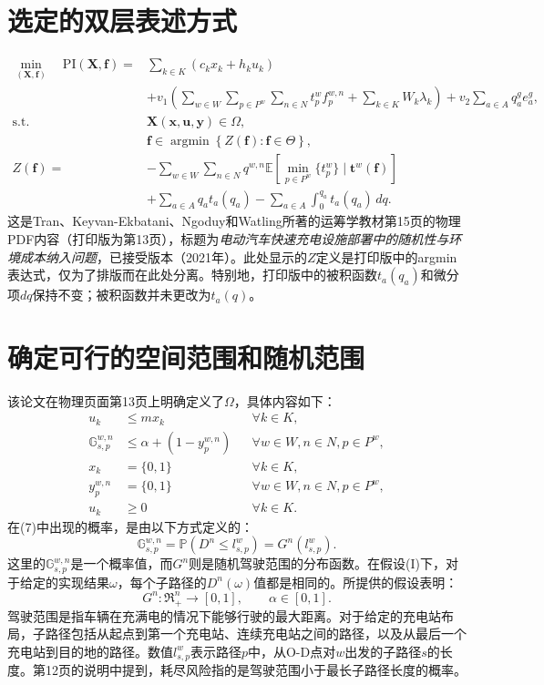 \documentclass{article}
\begin{document}
\section*{选定的双层表述方式}
\begin{equation}
\begin{aligned}
\min_{(\mathbf X,\mathbf f)}\quad
\mathrm{PI}(\mathbf X,\mathbf f)
={}&\sum_{k\in K}(c_kx_k+h_ku_k)\\
&+v_1\left(\sum_{w\in W}\sum_{p\in P^w}\sum_{n\in N}t_p^wf_p^{w,n}
+\sum_{k\in K}W_k\lambda_k\right)
+v_2\sum_{a\in A}q_a^ge_a^g,\\
\text{s.t.}\quad&\mathbf X(\mathbf x,\mathbf u,\mathbf y)\in\Omega,\\
&\mathbf f\in\operatorname*{argmin}\left\{Z(\mathbf f):\mathbf f\in\Theta\right\},\\
Z(\mathbf f)={}&-\sum_{w\in W}\sum_{n\in N}q^{w,n}
\mathbb E\left[\min_{p\in P^w}\{t_p^w\}\mid\mathbf t^w(\mathbf f)\right]\\
&+\sum_{a\in A}q_at_a(q_a)-\sum_{a\in A}\int_0^{q_a}t_a(q_a)\,dq.
\end{aligned}\tag{23}
\end{equation}
这是Tran、Keyvan-Ekbatani、Ngoduy和Watling所著的运筹学教材第15页的物理PDF内容（打印版为第13页），标题为\emph{电动汽车快速充电设施部署中的随机性与环境成本纳入问题}，已接受版本（2021年）。此处显示的$Z$定义是打印版中的argmin表达式，仅为了排版而在此处分离。特别地，打印版中的被积函数$t_a(q_a)$和微分项$dq$保持不变；被积函数并未更改为$t_a(q)$。

\section*{确定可行的空间范围和随机范围}
该论文在物理页面第13页上明确定义了$\Omega$，具体内容如下：
\begin{align}
u_k&\leq mx_k &&\forall k\in K,\tag{6}\\
\mathbb G_{s,p}^{w,n}&\leq\alpha+(1-y_p^{w,n})
&&\forall w\in W,n\in N,p\in P^w,\tag{7}\\
x_k&=\{0,1\} &&\forall k\in K,\tag{8}\\
y_p^{w,n}&=\{0,1\} &&\forall w\in W,n\in N,p\in P^w,\tag{9}\\
u_k&\geq0 &&\forall k\in K.\tag{10}
\end{align}
在(7)中出现的概率，是由以下方式定义的：
\begin{equation}
\mathbb G_{s,p}^{w,n}=\mathbb P\left(D^n\leq l_{s,p}^w\right)
=G^n(l_{s,p}^w).\tag{3}
\end{equation}
这里的$\mathbb G_{s,p}^{w,n}$是一个概率值，而$G^n$则是随机驾驶范围的分布函数。在假设(I)下，对于给定的实现结果$\omega$，每个子路径的$D^n(\omega)$值都是相同的。所提供的假设表明：
\[
G^n:\Re_+^n\longrightarrow[0,1],\qquad \alpha\in[0,1].
\]
驾驶范围是指车辆在充满电的情况下能够行驶的最大距离。对于给定的充电站布局，子路径包括从起点到第一个充电站、连续充电站之间的路径，以及从最后一个充电站到目的地的路径。数值$l_{s,p}^w$表示路径$p$中，从O-D点对$w$出发的子路径$s$的长度。第12页的说明中提到，耗尽风险指的是驾驶范围小于最长子路径长度的概率。
\end{document}
